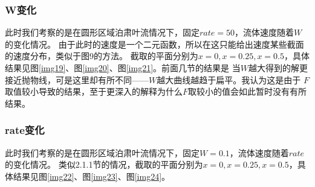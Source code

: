 \documentclass[11pt,UTF8]{ctexart}
\begin{document}
    \subsubsection{W变化}
    \par{此时我们考察的是在圆形区域泊肃叶流情况下，固定$rate=50$，流体速度随着$W$的变化情况。
    由于此时的速度是一个二元函数，所以在这只能给出速度某些截面的速度分布，类似于图9的方法。
    截取的平面分别为$x=0,x=0.25,x=0.5$，具体结果见图\ref {img19}、图\ref {img20}、图\ref {img21}。前面几节的结果是
    当$W$越大得到的解更接近抛物线，可是这里却有所不同——$W$越大曲线越趋于扁平。我认为这是由于
    $F$取值较小导致的结果，至于更深入的解释为什么$F$取较小的值会如此暂时没有有所结果。}
    \subsubsection{rate变化}
    \par{此时我们考察的是在圆形区域泊肃叶流情况下，固定$W=0.1$，流体速度随着$rate$的变化情况。
    类似2.1.1节的情况，截取的平面分别为$x=0,x=0.25,x=0.5$，具体结果见图\ref {img22}、图\ref {img23}、图\ref {img24}。}
\end{document}
